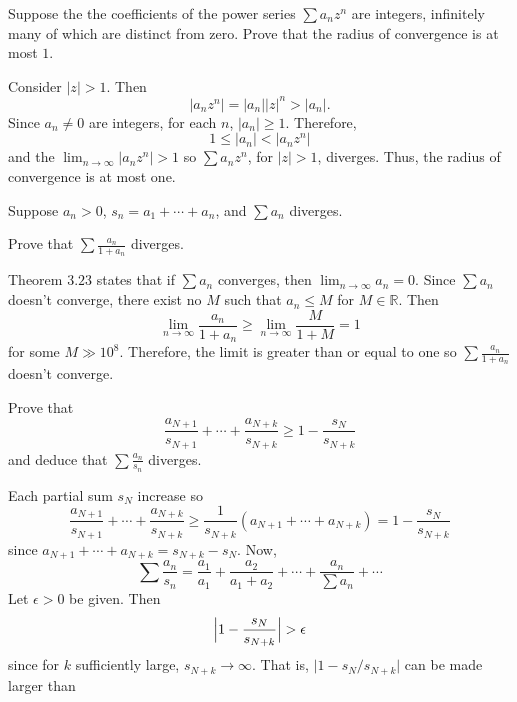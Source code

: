 \begin{exercise}
\begin{exercise}[label = (\alph*)]
  \end{exercise}
\item
  Suppose the the coefficients of the power series \(\sum a_nz^n\) are
  integers, infinitely many of which are distinct from zero.
  Prove that the radius of convergence is at most \(1\).
  \par\smallskip
  Consider \(\lvert z\rvert > 1\).
  Then
  \[
  \lvert a_nz^n\rvert = \lvert a_n\rvert\lvert z\rvert ^n > \lvert a_n\rvert.
  \]
  Since \(a_n\neq 0\) are integers, for each \(n\), \(\lvert a_n\rvert\geq 1\).
  Therefore,
  \[
  1\leq\lvert a_n\rvert < \lvert a_nz^n\rvert
  \]
  and the \(\lim_{n\to\infty}\lvert a_nz^n\rvert > 1\) so
  \(\sum a_nz^n\), for \(\lvert z\rvert > 1\), diverges.
  Thus, the radius of convergence is at most one.
\item
  Suppose \(a_n > 0\), \(s_n = a_1 + \cdots + a_n\), and \(\sum a_n\) diverges.
  \begin{exercise}[label = (\alph*), ref = \arabic{exercisei} (\alph*)]
  \item
    Prove that \(\sum\frac{a_n}{1 + a_n}\) diverges.
    \par\smallskip
    Theorem \(3.23\) states that if \(\sum a_n\) converges, then
    \(\lim_{n\to\infty}a_n = 0\).
    Since \(\sum a_n\) doesn't converge, there exist no \(M\) such that
    \(a_n\leq M\) for \(M\in\mathbb{R}\).
    Then
    \[
    \lim_{n\to\infty}\frac{a_n}{1 + a_n}\geq
    \lim_{n\to\infty}\frac{M}{1 + M} = 1
    \]
    for some \(M\gg 10^8\).
    Therefore, the limit is greater than or equal to one so
    \(\sum\frac{a_n}{1 + a_n}\) doesn't converge.
  \item
    \label{3.11.b}
    Prove that
    \[
    \frac{a_{N + 1}}{s_{N + 1}} + \cdots + \frac{a_{N + k}}{s_{N + k}}\geq 1
    - \frac{s_N}{s_{N + k}}
    \]
    and deduce that \(\sum\frac{a_n}{s_n}\) diverges.
    \par\smallskip
    Each partial sum \(s_N\) increase so
    \[
    \frac{a_{N + 1}}{s_{N + 1}} + \cdots + \frac{a_{N + k}}{s_{N + k}}\geq
    \frac{1}{s_{N + k}}(a_{N + 1} + \cdots + a_{N + k})  =
    1 - \frac{s_N}{s_{N + k}}
    \]
    since \(a_{N + 1} + \cdots + a_{N + k} = s_{N + k} - s_N\).
    Now,
    \[
    \sum\frac{a_n}{s_n} = \frac{a_1}{a_1} + \frac{a_2}{a_1 + a_2} + \cdots
    + \frac{a_n}{\sum a_n} + \cdots
    \]
    Let \(\epsilon > 0\) be given.
    Then
    \[
    \Bigl\lvert 1 - \frac{s_N}{s_{N + k}}\Bigr\rvert > \epsilon
    \]
    since for \(k\) sufficiently large, \(s_{N + k}\to\infty\).
    That is, \(\lvert 1 - s_N/s_{N + k}\rvert\) can be made larger than

\end{exercise}
\end{exercise}
